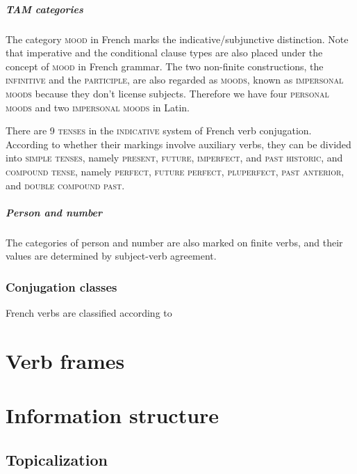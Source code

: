 \documentclass[a4paper, oneside, 12pt]{report}
\newcommand*{\category}[1]{\textsc{#1}}
\begin{document}
\paragraph*{TAM categories}
The category \category{mood} in French marks the indicative/subjunctive distinction.
Note that imperative and the conditional clause types
are also placed under the concept of \category{mood} in French grammar.
The two non-finite constructions, the \category{infinitive} and the \category{participle},
are also regarded as \category{moods},
known as \category{impersonal moods} because they don't license subjects.
Therefore we have four \category{personal moods} and two \category{impersonal moods} in Latin.

There are 9 \category{tenses} in the \category{indicative} system of French verb conjugation.
According to whether their markings involve auxiliary verbs,
they can be divided into \category{simple tenses}, namely \category{present}, \category{future}, \category{imperfect}, and \category{past historic},
and \category{compound tense}, namely \category{perfect}, \category{future perfect}, \category{pluperfect}, \category{past anterior}, and \category{double compound past}.

\paragraph*{Person and number}
The categories of person and number are also marked on finite verbs,
and their values are determined by subject-verb agreement. 

\subsection{Conjugation classes}

French verbs are classified according to 

\chapter{Verb frames}



\chapter{Information structure}

\section{Topicalization}\label{sec:information-structure.topic}
\end{document}
